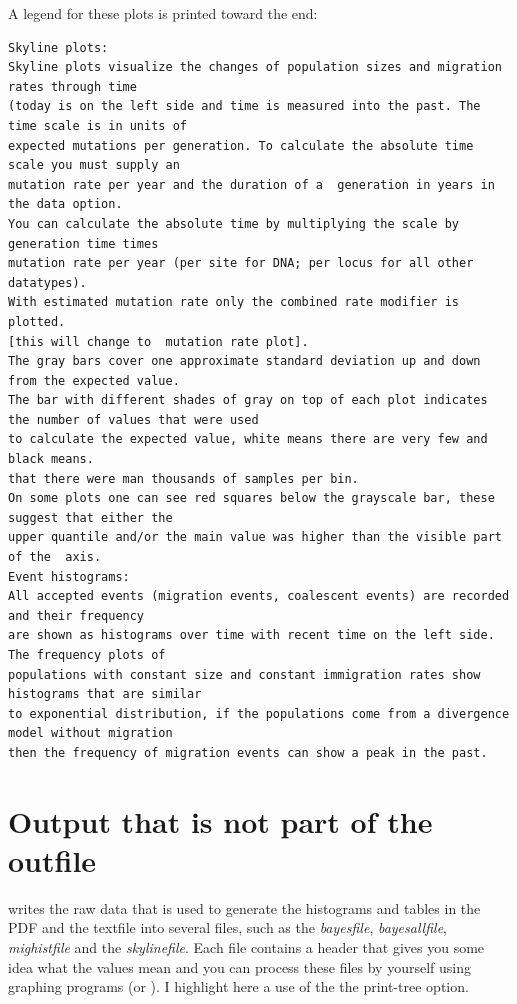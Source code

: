 A legend for these plots is printed toward the end:
\begin{footnotesize}
\begin{verbatim}
Skyline plots: 
Skyline plots visualize the changes of population sizes and migration rates through time 
(today is on the left side and time is measured into the past. The time scale is in units of 
expected mutations per generation. To calculate the absolute time scale you must supply an 
mutation rate per year and the duration of a  generation in years in the data option. 
You can calculate the absolute time by multiplying the scale by generation time times 
mutation rate per year (per site for DNA; per locus for all other datatypes). 
With estimated mutation rate only the combined rate modifier is plotted. 
[this will change to  mutation rate plot]. 
The gray bars cover one approximate standard deviation up and down from the expected value. 
The bar with different shades of gray on top of each plot indicates the number of values that were used 
to calculate the expected value, white means there are very few and black means. 
that there were man thousands of samples per bin. 
On some plots one can see red squares below the grayscale bar, these suggest that either the 
upper quantile and/or the main value was higher than the visible part of the  axis. 
Event histograms: 
All accepted events (migration events, coalescent events) are recorded and their frequency 
are shown as histograms over time with recent time on the left side. The frequency plots of 
populations with constant size and constant immigration rates show histograms that are similar 
to exponential distribution, if the populations come from a divergence model without migration 
then the frequency of migration events can show a peak in the past.
\end{verbatim}
\end{footnotesize}
\chapter{Output that is not part of the outfile}
\migrate writes the raw data that is used to generate the histograms and tables in the PDF and the textfile into several files, such as the \textsl{bayesfile}, \textsl{bayesallfile}, \textsl{mighistfile} and the \textsl{skylinefile}. Each file contains a header that gives you some idea what the values mean and you can process these files by yourself using graphing programs (or \tracer). I highlight here a use of the the print-tree option.
 
